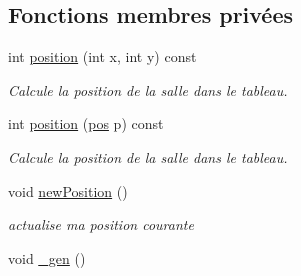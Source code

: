 \subsection*{Fonctions membres privées}
\begin{DoxyCompactItemize}
\item 
int \hyperlink{class_labyrinth_ac586bb4db152210ed424f77d68505502}{position} (int x, int y) const 
\begin{DoxyCompactList}\small\item\em Calcule la position de la salle dans le tableau. \end{DoxyCompactList}\item 
int \hyperlink{class_labyrinth_ac4400fc1f603dd48146be8108050bec4}{position} (\hyperlink{structpos}{pos} p) const 
\begin{DoxyCompactList}\small\item\em Calcule la position de la salle dans le tableau. \end{DoxyCompactList}\item 
\hypertarget{class_labyrinth_a775a1d628f1179dfca9655dbca6a43f3}{void \hyperlink{class_labyrinth_a775a1d628f1179dfca9655dbca6a43f3}{new\-Position} ()}\label{class_labyrinth_a775a1d628f1179dfca9655dbca6a43f3}

\begin{DoxyCompactList}\small\item\em actualise ma position courante \end{DoxyCompactList}\item 
\hypertarget{class_labyrinth_afc29f7969b11105584bf51c616740bce}{void \hyperlink{class_labyrinth_afc29f7969b11105584bf51c616740bce}{\-\_\-gen} ()}\label{class_labyrinth_afc29f7969b11105584bf51c616740bce}


\end{DoxyCompactItemize}
